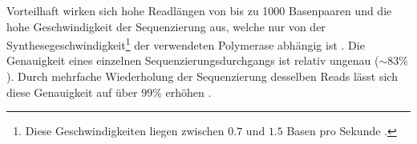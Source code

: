 	Vorteilhaft wirken sich hohe Readlängen von bis zu 1000 Basenpaaren und die hohe Geschwindigkeit der Sequenzierung aus, welche nur von der Synthesegeschwindigkeit\footnote{Diese Geschwindigkeiten liegen zwischen $0.7$ und $1.5$ Basen pro Sekunde \citep{Eid2009}.} der verwendeten Polymerase abhängig ist \citep{Metzker2010}. Die Genauigkeit eines einzelnen Sequenzierungsdurchgangs ist relativ ungenau ($\sim 83\%$). Durch mehrfache Wiederholung der Sequenzierung desselben Reads lässt sich diese Genauigkeit auf über $99\%$ erhöhen \citep{Eid2009}.
